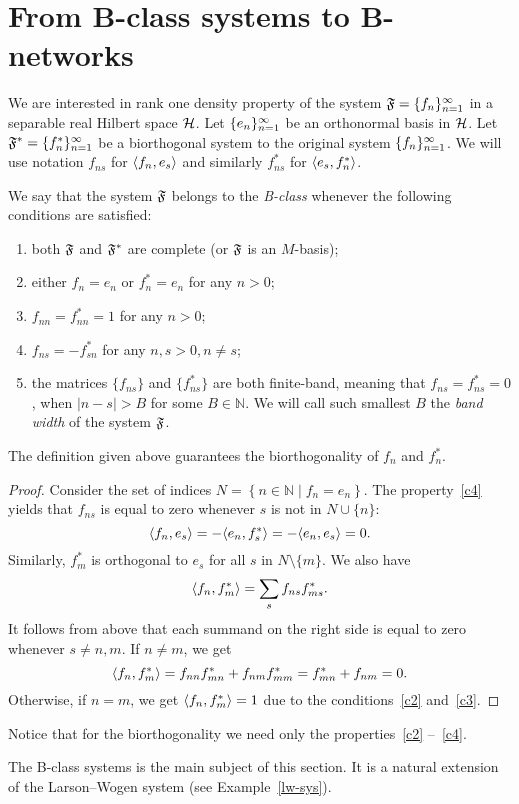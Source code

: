 \documentclass[12pt,oneside,a4paper]{amsart}
\begin{document}
\section{From B-class systems to B-networks}
    \label{sec:refor}
    \label{fsys2graphs}
    We are interested in rank one density property of the system $\fsys = \seq{f}$
      in a separable real Hilbert space $\cal{H}$.
    Let $\seq{e}$ be an orthonormal basis in $\cal{H}$.
    Let $\fstarsys = \{f_n^{*}\}_{n=1}^\infty$ be a biorthogonal system to the original system $\seq{f}$.
    We will use notation $f_{ns}$ for $\inner{f_n}{e_s}$ and similarly $f^*_{ns}$ for $\inner{e_s}{f^*_n}$.
    \begin{definition}
      We say that the system $\fsys$ belongs to the \emph{B-class} whenever the following conditions are satisfied:
      \begin{enumerate}[label=\textbf{C\arabic*}]
        \item \label{c1} both $\fsys$ and $\fstarsys$ are complete (or $\fsys$ is an $M$-basis);
        \item \label{c2} either $f_n = e_n$ or $f^*_n = e_n$ for any $n > 0$;
        \item \label{c3} $f_{nn} = f^*_{nn} = 1$ for any $n > 0$;
        \item \label{c4} $f_{ns} = -f^*_{sn}$ for any $n, s > 0, n \neq s$;
        \item \label{c5} the matrices $\{f_{ns}\}$ and $\{f^*_{ns}\}$ are both finite-band,
            meaning that $f_{ns} = f^*_{ns} = 0$, when $\lvert n - s \rvert > B$ for some $B \in \mathbb{N}$.
          We will call such smallest $B$ the \emph{band width} of the system $\fsys$.
      \end{enumerate}
    \end{definition}
    \begin{prop}
      The definition given above guarantees the biorthogonality of $f_n$ and $f^*_n$.
    \end{prop}
    \begin{proof}
      Consider the set of indices $N = \left\{n \in \mathbb{N} \mid f_n = e_n \right\}$.
      The property~\ref{c4} yields that $f_{ns}$ is equal to zero whenever $s$ is not in $N \cup \{n\}$:
      \[
        \inner{f_n}{e_s} = -\inner{e_n}{f^*_s} = -\inner{e_n}{e_s} = 0.
      \]
      Similarly, $f^*_m$ is orthogonal to $e_s$ for all $s$ in $N \setminus \{m\}$.
      We also have
      \[
        \inner{f_n}{f^*_m} = \sum_{s} f_{ns} f_{ms}^*.
      \]
      It follows from above that each summand on the right side is equal to zero whenever $s \neq n, m$.
      If $n \neq m$, we get
      \[
        \inner{f_n}{f^*_m} = f_{nn} f^*_{mn} + f_{nm} f^*_{mm}
        = f^*_{mn} + f_{nm} = 0.
      \]
      Otherwise, if $n = m$, we get $\inner{f_n}{f^*_m} = 1$ due to the conditions~\ref{c2} and~\ref{c3}.
    \end{proof}
    \begin{remark}
      Notice that for the biorthogonality we need only the properties~\ref{c2} --~\ref{c4}.
    \end{remark}
    The B-class systems is the main subject of this section.
    It is a natural extension of the Larson--Wogen system (see Example~\ref{lw-sys}).
\end{document}
